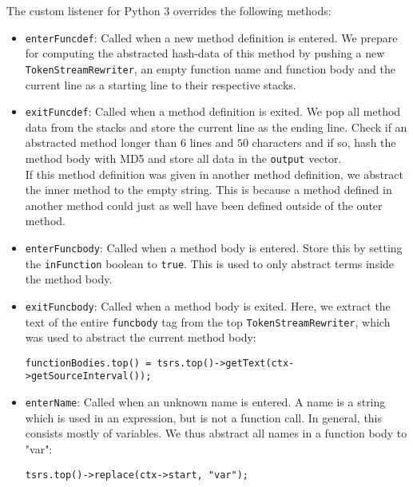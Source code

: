 \documentclass[../Main.tex]{subfiles}
\begin{document}
The custom listener for Python 3 overrides the following methods:
\begin{itemize}
    \item \texttt{enterFuncdef}: Called when a new method definition is entered. We prepare for computing the abstracted hash-data of this method by pushing a new \texttt{TokenStreamRewriter}, an empty function name and function body and the current line as a starting line to their respective stacks.
    \item \texttt{exitFuncdef}: Called when a method definition is exited. We pop all method data from the stacks and store the current line as the ending line. Check if an abstracted method longer than $6$ lines and $50$ characters and if so, hash the method body with MD5 and store all data in the \texttt{output} vector.\\
    
    If this method definition was given in another method definition, we abstract the inner method to the empty string. This is because a method defined in another method could just as well have been defined outside of the outer method.
    \item \texttt{enterFuncbody}: Called when a method body is entered. Store this by setting the \texttt{inFunction} boolean to \texttt{true}. This is used to only abstract terms inside the method body.
    \item \texttt{exitFuncbody}: Called when a method body is exited. Here, we extract the text of the entire \texttt{funcbody} tag from the top \texttt{TokenStreamRewriter}, which was used to abstract the current method body:
    \begin{lstlisting}
functionBodies.top() = tsrs.top()->getText(ctx->getSourceInterval());
    \end{lstlisting}
    \item \texttt{enterName}: Called when an unknown name is entered. A name is a string which is used in an expression, but is not a function call. In general, this consists mostly of variables. We thus abstract all names in a function body to "var":
    \begin{lstlisting}
tsrs.top()->replace(ctx->start, "var");
    \end{lstlisting}


\end{itemize}
\end{document}
